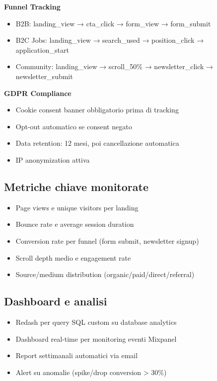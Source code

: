 \textbf{Funnel Tracking}
\begin{itemize}
  \item B2B: landing\_view → cta\_click → form\_view → form\_submit
  \item B2C Jobs: landing\_view → search\_used → position\_click → application\_start
  \item Community: landing\_view → scroll\_50\% → newsletter\_click → 
        newsletter\_submit
\end{itemize}

\textbf{GDPR Compliance}
\begin{itemize}
  \item Cookie consent banner obbligatorio prima di tracking
  \item Opt-out automatico se consent negato
  \item Data retention: 12 mesi, poi cancellazione automatica
  \item IP anonymization attiva
\end{itemize}

\subsection{Metriche chiave monitorate}
\begin{itemize}
  \item Page views e unique visitors per landing
  \item Bounce rate e average session duration
  \item Conversion rate per funnel (form submit, newsletter signup)
  \item Scroll depth medio e engagement rate
  \item Source/medium distribution (organic/paid/direct/referral)
\end{itemize}

\subsection{Dashboard e analisi}
\begin{itemize}
  \item Redash per query SQL custom su database analytics
  \item Dashboard real-time per monitoring eventi Mixpanel
  \item Report settimanali automatici via email
  \item Alert su anomalie (spike/drop conversion > 30\%)
\end{itemize}

